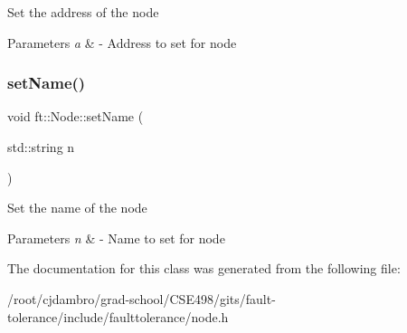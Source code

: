 Set the address of the node


\begin{DoxyParams}{Parameters}
{\em a} & -\/ Address to set for node \\
\hline
\end{DoxyParams}
\mbox{\label{classft_1_1Node_a0a09f86d4b043b0da034e7da0d83463c}} 
\subsubsection{\texorpdfstring{set\+Name()}{setName()}}
{\footnotesize\ttfamily void ft\+::\+Node\+::set\+Name (\begin{DoxyParamCaption}\item[{std\+::string}]{n }\end{DoxyParamCaption})\hspace{0.3cm}{\ttfamily [inline]}}

Set the name of the node


\begin{DoxyParams}{Parameters}
{\em n} & -\/ Name to set for node \\
\hline
\end{DoxyParams}


The documentation for this class was generated from the following file\+:\begin{DoxyCompactItemize}
\item 
/root/cjdambro/grad-\/school/\+C\+S\+E498/gits/fault-\/tolerance/include/faulttolerance/node.\+h\end{DoxyCompactItemize}
